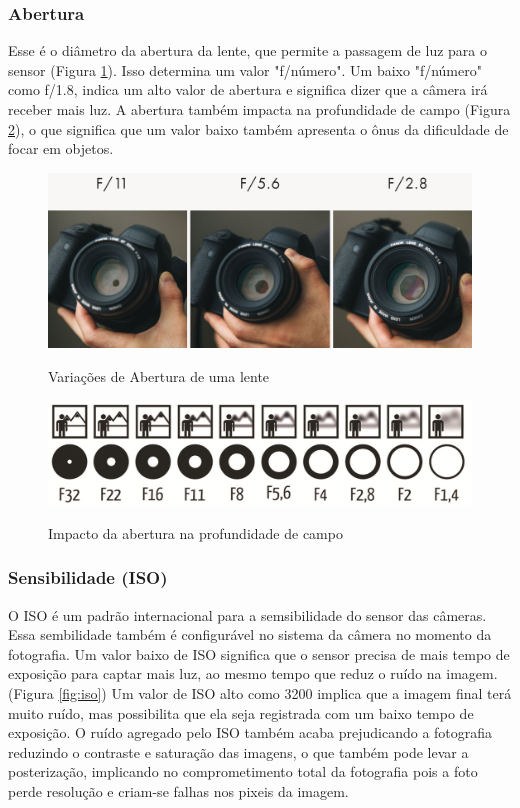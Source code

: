 \subsubsection{Abertura}

Esse é o diâmetro da abertura da lente, que permite a passagem de luz para o sensor (Figura \ref{fig:abertura}). Isso determina um valor "f/número". Um baixo "f/número" como f/1.8, indica um alto valor de abertura e significa dizer que a câmera irá receber mais luz. \cite{book:bbcsky} A abertura também impacta na profundidade de campo (Figura \ref{fig:profundidade}), o que significa que um valor baixo também apresenta o ônus da dificuldade de focar em objetos.

\begin{figure}[h]
	\centering
	\caption{Variações de Abertura de uma lente}
	\includegraphics[width=0.7\linewidth]{figuras/abertura}
	\label{fig:abertura}
\end{figure}

\begin{figure}[h]
	\centering
	\caption{Impacto da abertura na profundidade de campo}
	\includegraphics[width=0.7\linewidth]{figuras/profundidade}
	\label{fig:profundidade}
\end{figure}

\subsubsection{Sensibilidade (ISO)}

O ISO é um padrão internacional para a semsibilidade do sensor das câmeras. Essa sembilidade também é configurável no sistema da câmera no momento da fotografia. Um valor baixo de ISO significa que o sensor precisa de mais tempo de exposição para captar mais luz, ao mesmo tempo que reduz o ruído na imagem. (Figura \ref{fig:iso})
Um valor de ISO alto como 3200 implica que a imagem final terá muito ruído, mas possibilita que ela seja registrada com um baixo tempo de exposição. \cite{book:bbcsky} O ruído agregado pelo ISO também acaba prejudicando a fotografia reduzindo o contraste e saturação das imagens, o que também pode levar a posterização, implicando no comprometimento total da fotografia pois a foto perde resolução e criam-se falhas nos pixeis da imagem.


